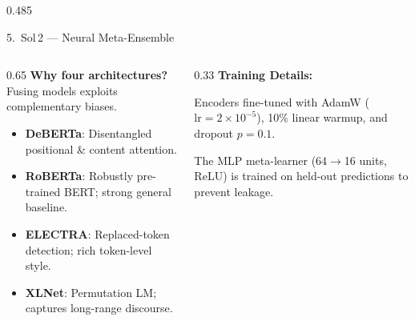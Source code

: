 \documentclass[final,t]{beamer}
\begin{document}
\begin{frame}[t]
\begin{columns}[T,totalwidth=\linewidth]
\begin{column}{0.485\linewidth}
\begin{exampleblock}{5.\ Sol\,2 — Neural Meta-Ensemble}
\begin{center}
      \end{center}

      \vspace{0.8ex}
      \begin{columns}[T,totalwidth=\linewidth]
        \begin{column}{0.65\linewidth}
          \textbf{Why four architectures?} Fusing models exploits complementary biases.
          \vspace{0.4ex}
          \begin{itemize}\itemsep4pt
            \item \textbf{DeBERTa}: Disentangled positional \& content attention.
            \item \textbf{RoBERTa}: Robustly pre-trained BERT; strong general baseline.
            \item \textbf{ELECTRA}: Replaced-token detection; rich token-level style.
            \item \textbf{XLNet}: Permutation LM; captures long-range discourse.
          \end{itemize}
        \end{column}
        \begin{column}{0.33\linewidth}
          \textbf{Training Details:}\par
          Encoders fine-tuned with AdamW ($\mathrm{lr}{=}2{\times}10^{-5}$), 10\% linear warmup, and dropout $p{=}0.1$.\par
          \vspace{0.6ex}
          The MLP meta-learner (64$\to$16 units, ReLU) is trained on held-out predictions to prevent leakage.
        \end{column}
      \end{columns}


\end{exampleblock}
\end{column}
\end{columns}
\end{frame}
\end{document}
